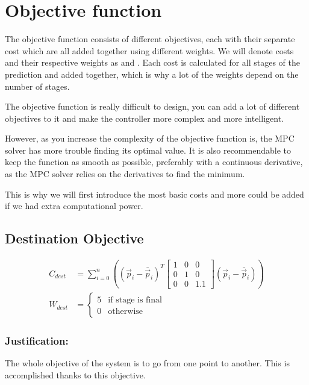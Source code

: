 \section{Objective function}

The objective function consists of different objectives, each with their separate cost which are all added together using different weights. We will denote costs and their respective weights as  and . Each cost is calculated for all stages of the prediction and added together, which is why a lot of the weights depend on the number of stages.

The objective function is really difficult to design, you can add a lot of different objectives to it and make the controller more complex and more intelligent. 

However, as you increase the complexity of the objective function is, the \ac{MPC} solver has more trouble finding its optimal value. It is also recommendable to keep the function as smooth as possible, preferably with a continuous derivative, as the \ac{MPC} solver relies on the derivatives to find the minimum.

This is why we will first introduce the most basic costs and more could be added if we had extra computational power.

\subsection{Destination Objective}

\begin{align}
C_{dest} & =
\sum_{i=0}^{n}\left(
(\vec p_i-\bar{\vec p}_i)^T
\begin{bmatrix}
1 & 0 & 0\\
0 & 1 & 0\\
0 & 0 & 1.1
\end{bmatrix}
(\vec p_i-\bar{\vec p}_i)\right)
\\
W_{dest} & = 
\begin{cases}
	5 & \text{if stage is final}
    \\ 0 & \text{otherwise}
\end{cases}
\end{align}

\subsubsection{Justification:}
The whole objective of the system is to go from one point to another. This is accomplished thanks to this objective.

